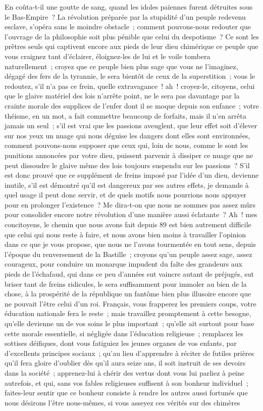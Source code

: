 \documentclass[french,twoside]{book} %
\begin{document}
En coûta-t-il une goutte de sang, quand les idoles païennes furent détruites sous le Bas-Empire ? La révolution préparée par la stupidité d’un peuple redevenu esclave, s’opéra sans le moindre obstacle ; comment pouvons-nous redouter que l’ouvrage de la philosophie soit plus pénible que celui du despotisme ? Ce sont les prêtres seuls qui captivent encore aux pieds de leur dieu chimérique ce peuple que vous craignez tant d’éclairer, éloignez-les de lui et le voile tombera naturellement ; croyez que ce peuple bien plus sage que vous ne l’imaginez, dégagé des fers de la tyrannie, le sera bientôt de ceux de la superstition ; vous le redoutez, s’il n’a pas ce frein, quelle extravagance ! ah ! croyez-le, citoyens, celui que le glaive matériel des lois n’arrête point, ne le sera pas davantage par la crainte morale des supplices de l’enfer dont il se moque depuis son enfance ; votre théisme, en un mot, a fait commettre beaucoup de forfaits, mais il n’en arrêta jamais un seul ; s’il est vrai que les passions aveuglent, que leur effet soit d’élever sur nos yeux un nuage qui nous déguise les dangers dont elles sont environnées, comment pouvons-nous supposer que ceux qui, loin de nous, comme le sont les punitions annoncées par votre dieu, puissent parvenir à dissiper ce nuage que ne peut dissoudre le glaive même des lois toujours suspendu sur les passions ? S’il est donc prouvé que ce supplément de freins imposé par l’idée d’un dieu, devienne inutile, s’il est démontré qu’il est dangereux par ses autres effets, je demande à quel usage il peut donc servir, et de quels motifs nous pourrions nous appuyer pour en prolonger l’existence ? Me dira-t-on que nous ne sommes pas assez mûrs pour consolider encore notre révolution d’une manière aussi éclatante ? Ah ! mes concitoyens, le chemin que nous avons fait depuis 89 est bien autrement difficile que celui qui nous reste à faire, et nous avons bien moins à travailler l’opinion dans ce que je vous propose, que nous ne l’avons tourmentée en tout sens, depuis l’époque du renversement de la Bastille ; croyons qu’un peuple assez sage, assez courageux, pour conduire un monarque impudent du faîte des grandeurs aux pieds de l’échafaud, qui dans ce peu d’années sut vaincre autant de préjugés, sut briser tant de freins ridicules, le sera suffisamment pour immoler au bien de la chose, à la prospérité de la république un fantôme bien plus illusoire encore que ne pouvait l’être celui d’un roi. Français, vous frapperez les premiers coups, votre éducation nationale fera le reste ; mais travaillez promptement à cette besogne, qu’elle devienne un de vos soins le plus important ; qu’elle ait surtout pour base cette morale essentielle, si négligée dans l’éducation religieuse ; remplacez les sottises déifiques, dont vous fatiguiez les jeunes organes de vos enfants, par d’excellents principes sociaux ; qu’au lieu d’apprendre à réciter de futiles prières qu’il fera gloire d’oublier dès qu’il aura seize ans, il soit instruit de ses devoirs dans la société ; apprenez-lui à chérir des vertus dont vous lui parliez à peine autrefois, et qui, sans vos fables religieuses suffisent à son bonheur individuel ; faites-leur sentir que ce bonheur consiste à rendre les autres aussi fortunés que nous désirons l’être nous-mêmes, si vous asseyez ces vérités sur des chimères 
\end{document}
